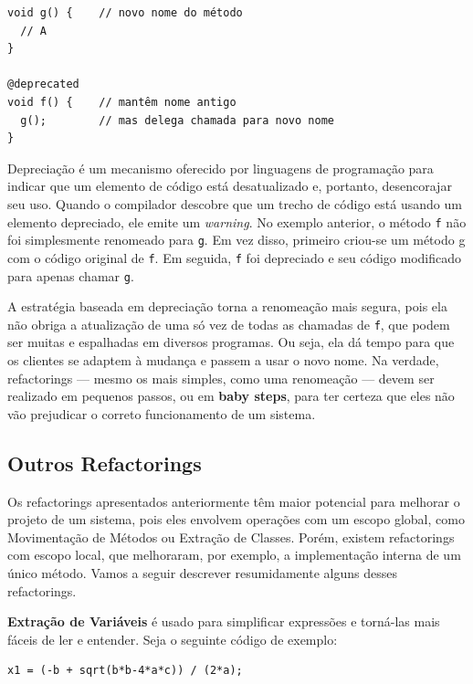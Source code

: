 \documentclass[
  11pt,
  twoside]{book}
\newcommand{\passthrough}[1]{#1}
\begin{document}
\begin{lstlisting}
void g() {    // novo nome do método
  // A
}

@deprecated
void f() {    // mantêm nome antigo
  g();        // mas delega chamada para novo nome
}
\end{lstlisting}

Depreciação é um mecanismo oferecido por linguagens de programação para
indicar que um elemento de código está desatualizado e, portanto,
desencorajar seu uso. Quando o compilador descobre que um trecho de
código está usando um elemento depreciado, ele emite um \emph{warning}.
No exemplo anterior, o método \passthrough{\lstinline!f!} não foi
simplesmente renomeado para \passthrough{\lstinline!g!}. Em vez disso,
primeiro criou-se um método g com o código original de
\passthrough{\lstinline!f!}. Em seguida, \passthrough{\lstinline!f!} foi
depreciado e seu código modificado para apenas chamar
\passthrough{\lstinline!g!}.

A estratégia baseada em depreciação torna a renomeação mais segura, pois
ela não obriga a atualização de uma só vez de todas as chamadas de
\passthrough{\lstinline!f!}, que podem ser muitas e espalhadas em
diversos programas. Ou seja, ela dá tempo para que os clientes se
adaptem à mudança e passem a usar o novo nome. Na verdade, refactorings
--- mesmo os mais simples, como uma renomeação --- devem ser realizado
em pequenos passos, ou em \textbf{baby steps}, para ter certeza que eles
não vão prejudicar o correto funcionamento de um sistema.

\hypertarget{outros-refactorings}{%
\subsection{Outros Refactorings}\label{outros-refactorings}}

Os refactorings apresentados anteriormente têm maior potencial para
melhorar o projeto de um sistema, pois eles envolvem operações com um
escopo global, como Movimentação de Métodos ou Extração de Classes.
Porém, existem refactorings com escopo local, que melhoraram, por
exemplo, a implementação interna de um único método. Vamos a seguir
descrever resumidamente alguns desses refactorings.

 \textbf{Extração de Variáveis}
é usado para simplificar expressões e torná-las mais fáceis de ler e
entender. Seja o seguinte código de exemplo:

\begin{lstlisting}
x1 = (-b + sqrt(b*b-4*a*c)) / (2*a);
\end{lstlisting}
\end{document}
